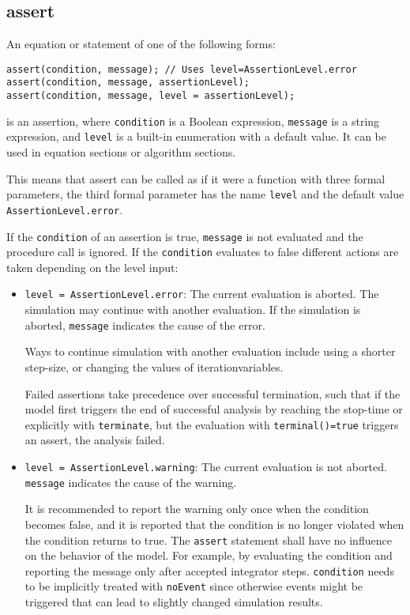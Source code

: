 \subsection{assert}

An equation or statement of one of the following forms:
\begin{lstlisting}[language=modelica]
assert(condition, message); // Uses level=AssertionLevel.error
assert(condition, message, assertionLevel);
assert(condition, message, level = assertionLevel);
\end{lstlisting}

is an assertion, where \lstinline!condition! is a Boolean expression, \lstinline!message! is a
string expression, and \lstinline!level! is a built-in enumeration with a default
value. It can be used in equation sections or algorithm sections.

\begin{nonnormative}
This means that assert can be called as if it were a function with three formal parameters, the third formal parameter has the
name \lstinline!level! and the default value \lstinline!AssertionLevel.error!.
\end{nonnormative}

If the \lstinline!condition! of an assertion is true, \lstinline!message! is not evaluated and
the procedure call is ignored. If the \lstinline!condition! evaluates to false
different actions are taken depending on the level input:
\begin{itemize}
\item
  \lstinline!level = AssertionLevel.error!: The current evaluation is aborted. The
  simulation may continue with another evaluation. If the simulation is aborted, \lstinline!message! indicates the
  cause of the error.
  \begin{nonnormative}
  Ways to continue simulation with another evaluation include using a shorter step-size, or changing the values of iterationvariables.
  \end{nonnormative}
  Failed assertions take precedence over successful termination, such
  that if the model first triggers the end of successful analysis by
  reaching the stop-time or explicitly with \lstinline!terminate!, but the
  evaluation with \lstinline!terminal()=true! triggers an assert, the analysis
  failed.
\item
  \lstinline!level = AssertionLevel.warning!: The current evaluation is not aborted.
  \lstinline!message! indicates the cause of the warning.
  \begin{nonnormative}
  It is recommended to report the warning only once when the condition becomes false, and it is reported that the condition is no longer
  violated when the condition returns to true. The \lstinline!assert! statement shall have no influence on the behavior of the model.
  For example, by evaluating the condition and reporting the message only after accepted integrator steps.  \lstinline!condition! needs to
  be implicitly treated with \lstinline!noEvent! since otherwise events might be triggered that can lead to slightly changed simulation results.
  \end{nonnormative}
\end{itemize}

